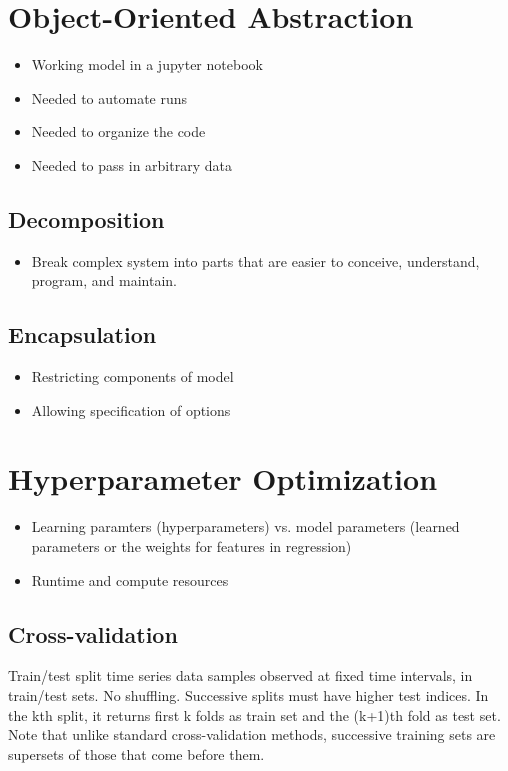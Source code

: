 \documentclass[11pt, oneside]{article}
\begin{document}
\section{Object-Oriented Abstraction}
  \begin{itemize}
    \item{Working model in a jupyter notebook}
    \item{Needed to automate runs}
    \item{Needed to organize the code}
    \item{Needed to pass in arbitrary data}
  \end{itemize}

\subsection{Decomposition}
  \begin{itemize}
    \item{Break complex system into parts that are easier to conceive, understand, program, and maintain.}
  \end{itemize}
\subsection{Encapsulation}
  \begin{itemize}
    \item{Restricting components of model}
    \item{Allowing specification of options}
  \end{itemize}

\section{Hyperparameter Optimization}
\begin{itemize}
  \item{Learning paramters (hyperparameters) vs. model parameters (learned parameters or the weights for features in regression)}
  \item{Runtime and compute resources}
\end{itemize}

\subsection{Cross-validation}
Train/test split time series data samples observed at fixed time intervals, in train/test sets.
No shuffling. Successive splits must have higher test indices.
In the kth split, it returns first k folds as train set and the (k+1)th fold as test set.
Note that unlike standard cross-validation methods, successive training sets are supersets of those that come before them.
\end{document}
